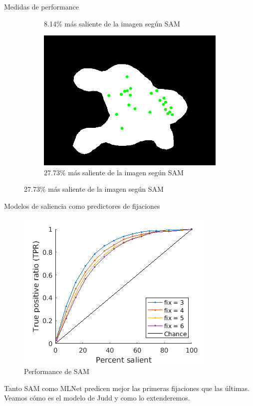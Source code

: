 \documentclass[compress]{beamer}
\begin{document}
\begin{frame}{Medidas de performance}
\begin{figure}[b]
\begin{subfigure}[t]{0.3\textwidth}
        \caption{\footnotesize 8.14\% más saliente de la imagen según SAM} \label{fig:example-salient-percent-8-14}
    \end{subfigure}
	\hfill
	\begin{subfigure}[t]{0.3\textwidth}
        \centering
        \includegraphics[width=\linewidth]{images/example-salient-percent-27-73.png} 
        \caption{\footnotesize
27.73\% más saliente de la imagen según SAM} \label{fig:example-salient-percent-27-73}
    \end{subfigure}
\end{figure}

\end{frame}

\begin{frame}{Modelos de saliencia como predictores de fijaciones}

\begin{figure}
\includegraphics[width=0.5\linewidth]{images/sam_all_fix_small.png} 
\caption{Performance de SAM}
\end{figure}

{\footnotesize Tanto SAM como MLNet predicen mejor las primeras fijaciones que las últimas. Veamos cómo es el modelo de Judd y como lo extenderemos.}

\end{frame}
\end{document}
